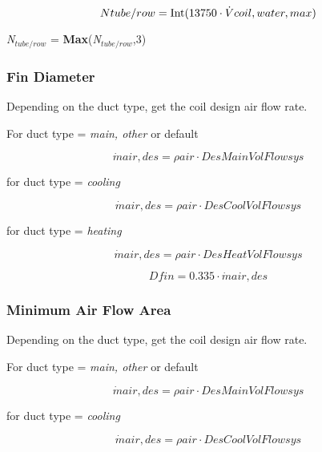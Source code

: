 \begin{equation}
Ntube/row = {\mathop{\rm Int}\nolimits} ({\rm{13750}}\cdot \dot Vcoil,water,max)
\end{equation}

\emph{N\(_{tube/row}\)} = \textbf{Max}(\emph{N\(_{tube/row}\)},3)

\subsubsection{Fin Diameter}\label{fin-diameter}

Depending on the duct type, get the coil design air flow rate.

For duct type = \emph{main, other} or default

\begin{equation}
\dot mair,des = \rho air\cdot DesMainVolFlowsys
\end{equation}

for duct type = \emph{cooling}

\begin{equation}
\dot mair,des = \rho air\cdot DesCoolVolFlowsys
\end{equation}

for duct type = \emph{heating}

\begin{equation}
\dot mair,des = \rho air\cdot DesHeatVolFlowsys
\end{equation}

\begin{equation}
Dfin = 0.335\cdot \dot mair,des
\end{equation}

\subsubsection{Minimum Air Flow Area}\label{minimum-air-flow-area}

Depending on the duct type, get the coil design air flow rate.

For duct type = \emph{main, other} or default

\begin{equation}
\dot mair,des = \rho air\cdot DesMainVolFlowsys
\end{equation}

for duct type = \emph{cooling}

\begin{equation}
\dot mair,des = \rho air\cdot DesCoolVolFlowsys
\end{equation}

